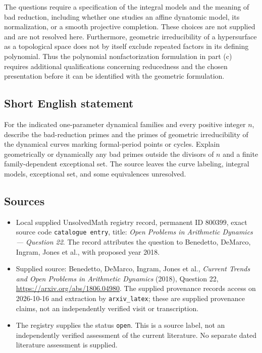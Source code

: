\documentclass[11pt]{article}
\begin{document}
The questions require a specification of the integral models and the meaning of bad reduction, including whether one studies an affine dynatomic model, its normalization, or a smooth projective completion. These choices are not supplied and are not resolved here. Furthermore, geometric irreducibility of a hypersurface as a topological space does not by itself exclude repeated factors in its defining polynomial. Thus the polynomial nonfactorization formulation in part (c) requires additional qualifications concerning reducedness and the chosen presentation before it can be identified with the geometric formulation.
\subsection{Short English statement}
For the indicated one-parameter dynamical families and every positive integer \(n\), describe the bad-reduction primes and the primes of geometric irreducibility of the dynamical curves marking formal-period points or cycles. Explain geometrically or dynamically any bad primes outside the divisors of \(n\) and a finite family-dependent exceptional set. The source leaves the curve labeling, integral models, exceptional set, and some equivalences unresolved.
\subsection{Sources}
\begin{itemize}
\item Local supplied UnsolvedMath registry record, permanent ID \(800399\), exact source code \texttt{catalogue entry}, title: \emph{Open Problems in Arithmetic Dynamics --- Question 22}. The record attributes the question to Benedetto, DeMarco, Ingram, Jones et al., with proposed year 2018.
\item Supplied source: Benedetto, DeMarco, Ingram, Jones et al., \emph{Current Trends and Open Problems in Arithmetic Dynamics} (2018), Question 22, \url{https://arxiv.org/abs/1806.04980}. The supplied provenance records access on 2026-10-16 and extraction by \texttt{arxiv\_latex}; these are supplied provenance claims, not an independently verified visit or transcription.
\item The registry supplies the status \texttt{open}. This is a source label, not an independently verified assessment of the current literature. No separate dated literature assessment is supplied.
\end{itemize}
\end{document}
